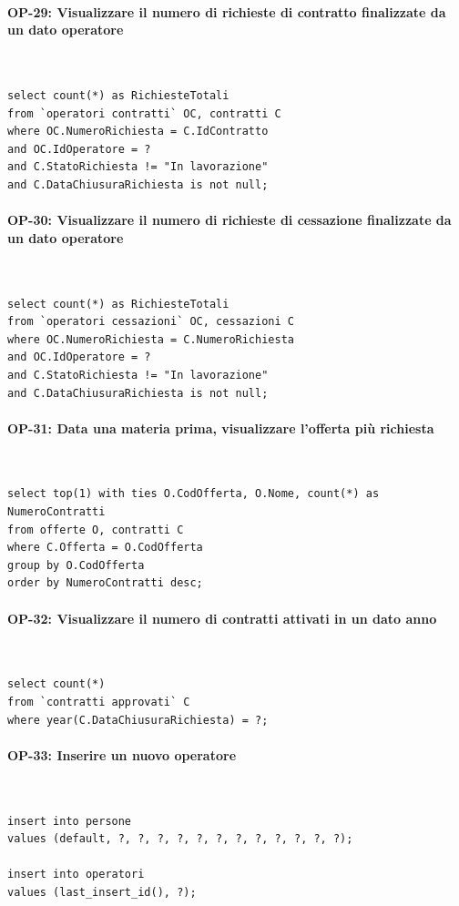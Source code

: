 \documentclass[a4paper,12pt]{report}
\begin{document}
\paragraph{OP-29: Visualizzare il numero di richieste di contratto finalizzate da un dato operatore}\mbox{}\\
\begin{lstlisting}
select count(*) as RichiesteTotali
from `operatori contratti` OC, contratti C
where OC.NumeroRichiesta = C.IdContratto
and OC.IdOperatore = ?
and C.StatoRichiesta != "In lavorazione"
and C.DataChiusuraRichiesta is not null;
\end{lstlisting}

\paragraph{OP-30: Visualizzare il numero di richieste di cessazione finalizzate da un dato operatore}\mbox{}\\
\begin{lstlisting}
select count(*) as RichiesteTotali
from `operatori cessazioni` OC, cessazioni C
where OC.NumeroRichiesta = C.NumeroRichiesta
and OC.IdOperatore = ?
and C.StatoRichiesta != "In lavorazione"
and C.DataChiusuraRichiesta is not null;
\end{lstlisting}

\paragraph{OP-31: Data una materia prima, visualizzare l'offerta più richiesta}\mbox{}\\
\begin{lstlisting}
select top(1) with ties O.CodOfferta, O.Nome, count(*) as NumeroContratti
from offerte O, contratti C
where C.Offerta = O.CodOfferta
group by O.CodOfferta
order by NumeroContratti desc;
\end{lstlisting}

\paragraph{OP-32: Visualizzare il numero di contratti attivati in un dato anno}\mbox{}\\
\begin{lstlisting}
select count(*)
from `contratti approvati` C
where year(C.DataChiusuraRichiesta) = ?;
\end{lstlisting}

\paragraph{OP-33: Inserire un nuovo operatore}\mbox{}\\
\begin{lstlisting}
insert into persone
values (default, ?, ?, ?, ?, ?, ?, ?, ?, ?, ?, ?, ?);

insert into operatori
values (last_insert_id(), ?);
\end{lstlisting}
\end{document}
